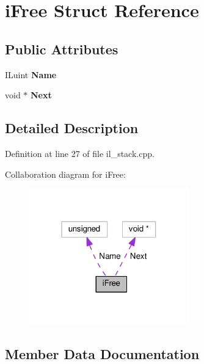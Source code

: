 \hypertarget{structiFree}{}\section{i\+Free Struct Reference}
\label{structiFree}
\subsection*{Public Attributes}
\begin{DoxyCompactItemize}
\item 
\mbox{\label{structiFree_adfce14622391e479ceba0f8e33870672}} 
I\+Luint {\bfseries Name}
\item 
\mbox{\label{structiFree_a782f2d0256158d866cb315b5ac748e13}} 
void $\ast$ {\bfseries Next}
\end{DoxyCompactItemize}


\subsection{Detailed Description}


Definition at line 27 of file il\+\_\+stack.\+cpp.



Collaboration diagram for i\+Free\+:
\nopagebreak
\begin{figure}[H]
\begin{center}
\leavevmode
\includegraphics[width=196pt]{d6/d90/structiFree__coll__graph}
\end{center}
\end{figure}


\subsection{Member Data Documentation}
\mbox{\label{structiFree_adfce14622391e479ceba0f8e33870672}} 
